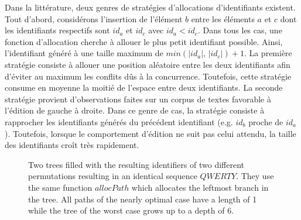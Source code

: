 Dans la littérature, deux genres de stratégies d'allocations d'identifiants
existent. Tout d'abord, considérons l'insertion de l'élément $b$ entre les
éléments $a$ et $c$ dont les identifiants respectifs sont $id_a$ et $id_c$ avec
$id_a<id_c$. Dans tous les cas, une fonction d'allocation cherche à allouer le
plus petit identifiant possible. Ainsi, l'identifiant généré à une taille
maximum de $min(|id_a|,\, |id_c|)+1$. La première stratégie consiste à allouer
une position aléatoire entre les deux identifiants afin d'éviter au maximum les
conflits dûs à la concurrence. Toutefois, cette stratégie consume en moyenne la
moitié de l'espace entre deux identifiants. La seconde stratégie provient
d'observations faites sur un corpus de textes favorable à l'édition de gauche à
droite. Dans ce genre de cas, la stratégie consiste à rapprocher les
identifiants générés du précédent identifiant (e.g. $id_b$ proche de
$id_a$). Toutefois, lorsque le comportement d'édition ne suit pas celui attendu,
la taille des identifiants croît très rapidement.

\begin{figure}
  \centering
  
  \caption{\label{fig:allocpathexample} Two trees filled with the resulting
    identifiers of two different permutations resulting in an identical
    sequence $QWERTY$. They use the same function $allocPath$ which allocates
    the leftmost branch in the tree. All paths of the nearly optimal case have
    a length of 1 while the tree of the worst case grows up to a depth of 6.}
\end{figure}

